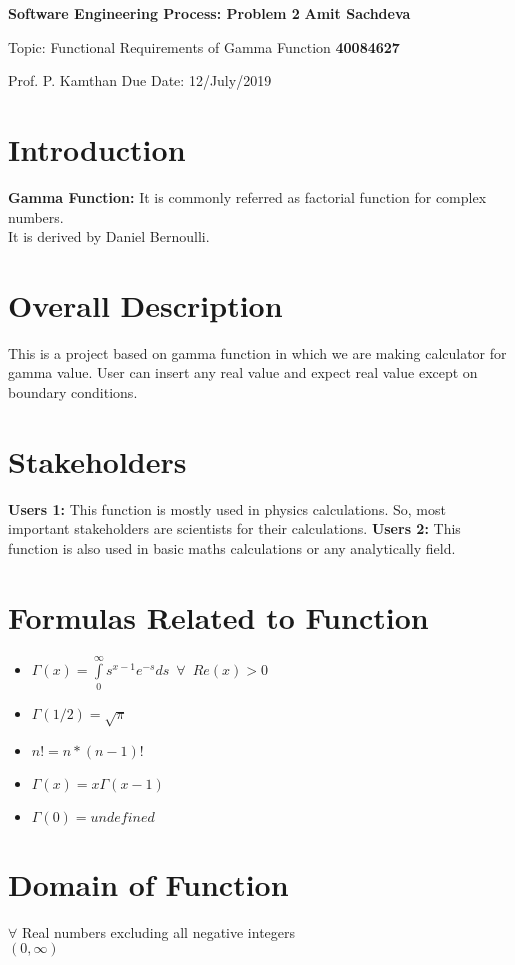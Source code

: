 \documentclass{article}
\begin{document}
\noindent
\large\textbf{Software Engineering Process: Problem 2} \hfill \textbf{Amit Sachdeva} 

\normalsize Topic: Functional Requirements of Gamma Function \hfill \textbf{40084627} 

Prof. P. Kamthan \hfill Due Date: 12/July/2019

\section{Introduction} 
\textbf{Gamma Function: } It is commonly referred as factorial function for complex numbers.\\  It is derived by Daniel Bernoulli.

\section{Overall Description} 
This is a project based on gamma function in which we are making calculator for gamma value. User can insert any real value and expect real value except on boundary conditions.

\section{Stakeholders} 
\textbf{Users 1:} This function is mostly used in physics calculations. So, most important stakeholders are scientists for their calculations.
\newline
\textbf{Users 2:} This function is also used in basic maths calculations or any analytically field. 



\section{Formulas Related to Function}
\begin{itemize}
\item $  \Gamma \left( x \right) = \int\limits_0^\infty {s^{x - 1} e^{ - s} ds} \enspace \forall \enspace Re(x)>0$
\item $  \Gamma \left( 1/2 \right) = \sqrt{\pi}$
\item $  n! = n*(n-1)!$
\item $  \Gamma \left( x \right) = x\Gamma \left( x-1\right) $
\item $  \Gamma \left( 0 \right) = undefined $
\end{itemize}

\section{Domain of Function}
$\forall$ Real numbers excluding all negative integers \\
$(0, \infty)$
\end{document}
